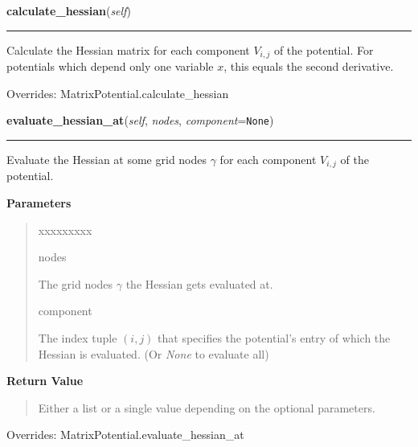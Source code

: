 \hspace{.8\funcindent}\begin{boxedminipage}{\funcwidth}

    \raggedright \textbf{calculate\_hessian}(\textit{self})

    \vspace{-1.5ex}

    \rule{\textwidth}{0.5\fboxrule}
\setlength{\parskip}{2ex}
    Calculate the Hessian matrix for each component $V_{i,j}$ of the
    potential. For potentials which depend only one variable $x$, this
    equals the second derivative.

\setlength{\parskip}{1ex}


      Overrides: MatrixPotential.calculate\_hessian

    \end{boxedminipage}

    \vspace{0.5ex}

\hspace{.8\funcindent}\begin{boxedminipage}{\funcwidth}

    \raggedright \textbf{evaluate\_hessian\_at}(\textit{self}, \textit{nodes}, \textit{component}={\tt None})

    \vspace{-1.5ex}

    \rule{\textwidth}{0.5\fboxrule}
\setlength{\parskip}{2ex}
    Evaluate the Hessian at some grid nodes $\gamma$ for
    each component $V_{i,j}$ of the potential.

\setlength{\parskip}{1ex}
      \textbf{Parameters}
      \vspace{-1ex}

      \begin{quote}
        \begin{Ventry}{xxxxxxxxx}

          \item[nodes]

          The grid nodes $\gamma$ the Hessian gets
          evaluated at.

          \item[component]

          The index tuple $\left(i,j \right)$ that specifies
          the potential's entry of which the Hessian is evaluated. (Or
          \textit{None} to evaluate all)

        \end{Ventry}

      \end{quote}

      \textbf{Return Value}
    \vspace{-1ex}

      \begin{quote}
      Either a list or a single value depending on the optional parameters.

      \end{quote}



      Overrides: MatrixPotential.evaluate\_hessian\_at

    \end{boxedminipage}

